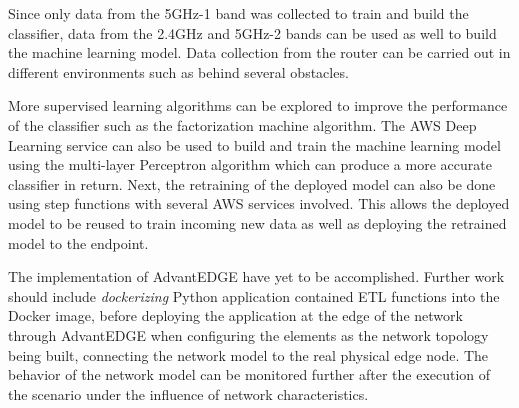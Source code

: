 Since only data from the 5GHz-1 band was collected to train and build the classifier, data from the 2.4GHz and 5GHz-2 bands can be used as well to build the machine learning model. Data collection from the router can be carried out in different environments such as behind several obstacles. 

More supervised learning algorithms can be explored to improve the performance of the classifier such as the factorization machine algorithm. The AWS Deep Learning service can also be used to build and train the machine learning model using the multi-layer Perceptron algorithm which can produce a more accurate classifier in return. Next, the retraining of the deployed model can also be done using step functions with several AWS services involved. This allows the deployed model to be reused to train incoming new data as well as deploying the retrained model to the endpoint.



%

The implementation of AdvantEDGE have yet to be accomplished. Further work should include \textit{dockerizing} Python application contained ETL functions into the Docker image, before deploying the application at the edge of the network through AdvantEDGE when configuring the elements as the network topology being built, connecting the network model to the real physical edge node. The behavior of the network model can be monitored further after the execution of the scenario under the influence of network characteristics. 